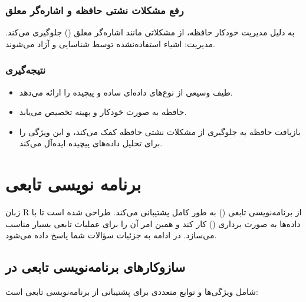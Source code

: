 \documentclass[11pt, a4paper, oneside]{book}
\begin{document}
			\subsection{رفع مشکلات نشتی حافظه و اشاره‌گر معلق}
			
				 به دلیل مدیریت خودکار حافظه، از مشکلاتی مانند اشاره‌گر معلق () جلوگیری می‌کند.
				مدیریت: اشیاء استفاده‌نشده توسط  شناسایی و آزاد می‌شوند.
			
			\subsection{نتیجه‌گیری}
			
				\begin{itemize}
					
					\item {} طیف وسیعی از نوع‌های داده‌ای ساده و پیچیده را ارائه می‌دهد.
					
					\item حافظه به صورت خودکار و بهینه تخصیص می‌یابد.
					
					\item بازیافت حافظه به جلوگیری از مشکلات نشتی حافظه کمک می‌کند، و این ویژگی  را برای تحلیل داده‌های پیچیده ایده‌آل می‌کند.
					
				\end{itemize}
				
	\chapter{برنامه نویسی تابعی}
	
		زبان R از برنامه‌نویسی تابعی () به طور کامل پشتیبانی می‌کند.  طراحی شده است تا با داده‌ها به صورت برداری () کار کند و همین امر آن را برای عملیات تابعی بسیار مناسب می‌سازد. در ادامه به جزئیات سؤالات شما پاسخ داده می‌شود.
		
		\section{سازوکارهای برنامه‌نویسی تابعی در }
			
			شامل ویژگی‌ها و توابع متعددی برای پشتیبانی از برنامه‌نویسی تابعی است:
			
\end{document}
